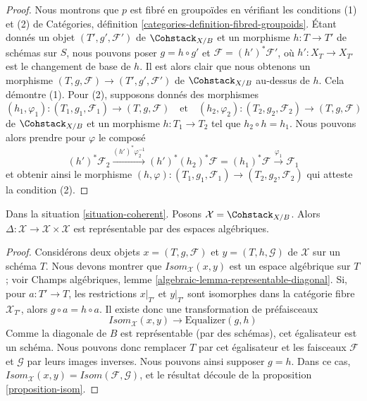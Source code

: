 \begin{proof}
Nous montrons que $p$ est fibré en groupoïdes en vérifiant les conditions (1)
et (2) de Catégories, définition
\ref{categories-definition-fibred-groupoids}. Étant donnés un objet
$(T', g', \mathcal{F}')$ de $\Cohstack_{X/B}$ et un morphisme
$h : T \to T'$ de schémas sur $S$, nous pouvons poser $g = h \circ g'$ et
$\mathcal{F} = (h')^*\mathcal{F}'$, où $h' : X_T \to X_{T'}$ est le
changement de base de $h$. Il est alors clair que nous obtenons un morphisme
$(T, g, \mathcal{F}) \to (T', g', \mathcal{F}')$ de $\Cohstack_{X/B}$
au-dessus de $h$. Cela démontre (1). Pour (2), supposons donnés des morphismes
$$
(h_1, \varphi_1) : (T_1, g_1, \mathcal{F}_1) \to (T, g, \mathcal{F})
\quad\text{et}\quad
(h_2, \varphi_2) : (T_2, g_2, \mathcal{F}_2) \to (T, g, \mathcal{F})
$$
de $\Cohstack_{X/B}$ et un morphisme $h : T_1 \to T_2$ tel que
$h_2 \circ h = h_1$. Nous pouvons alors prendre pour $\varphi$ le composé
$$
(h')^*\mathcal{F}_2
\xrightarrow{(h')^*\varphi_2^{-1}}
(h')^*(h_2)^*\mathcal{F} = (h_1)^*\mathcal{F}
\xrightarrow{\varphi_1}
\mathcal{F}_1
$$
et obtenir ainsi le morphisme
$(h, \varphi) : (T_1, g_1, \mathcal{F}_1) \to (T_2, g_2, \mathcal{F}_2)$
qui atteste la condition (2).
\end{proof}

\begin{lemma}
\label{lemma-coherent-diagonal}
Dans la situation \ref{situation-coherent}. Posons
$\mathcal{X} = \Cohstack_{X/B}$. Alors
$\Delta : \mathcal{X} \to \mathcal{X} \times \mathcal{X}$ est représentable
par des espaces algébriques.
\end{lemma}

\begin{proof}
Considérons deux objets $x = (T, g, \mathcal{F})$ et
$y = (T, h, \mathcal{G})$ de $\mathcal{X}$ sur un schéma $T$. Nous devons
montrer que $\mathit{Isom}_\mathcal{X}(x, y)$ est un espace algébrique sur
$T$ ; voir Champs algébriques, lemme
\ref{algebraic-lemma-representable-diagonal}. Si, pour $a : T' \to T$, les
restrictions $x|_{T'}$ et $y|_{T'}$ sont isomorphes dans la catégorie fibre
$\mathcal{X}_{T'}$, alors $g \circ a = h \circ a$. Il existe donc une
transformation de préfaisceaux
$$
\mathit{Isom}_\mathcal{X}(x, y) \longrightarrow \text{Equalizer}(g, h)
$$
Comme la diagonale de $B$ est représentable (par des schémas), cet égalisateur
est un schéma. Nous pouvons donc remplacer $T$ par cet égalisateur et les
faisceaux $\mathcal{F}$ et $\mathcal{G}$ par leurs images inverses. Nous
pouvons ainsi supposer $g = h$. Dans ce cas,
$\mathit{Isom}_\mathcal{X}(x, y) = \mathit{Isom}(\mathcal{F}, \mathcal{G})$,
et le résultat découle de la proposition \ref{proposition-isom}.
\end{proof}

